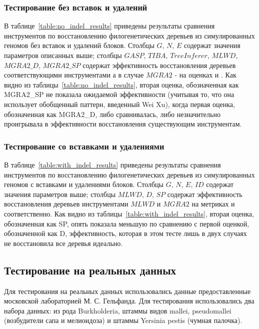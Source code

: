 \subsubsection{Тестирование без вставок и удалений}

В таблице~\ref{table:no_indel_results} приведены результаты сравнения инструментов
по восстановлению филогенетических деревьев из симулированных геномов без вставок и удалений блоков.
Столбцы $G$, $N$, $E$ содержат значения параметров описанных выше;
столбцы $GAS P$, $TIBA$, $TreeInferer$, $MLWD$, $MGRA2\_D$, $MGRA2\_SP$ содержат эффективность восстановления деревьев соответствующими инструментами
а в случае $MGRA2$ - на оценках  и .
Как видно из таблицы~\ref{table:no_indel_results}, вторая оценка, обозначенная как MGRA2\_SP не показала ожидаемой эффективности
(учитывая то, что она использует обобщенный паттерн, введенный Wei Xu),
когда первая оценка, обозначенная как MGRA2\_D, либо сравнивалась, либо незначительно проигрывала в эффективности восстановления существующим инструментам.

\subsubsection{Тестирование со вставками и удалениями}

В таблице~\ref{table:with_indel_results} приведены результаты сравнения инструментов
по восстановлению филогенетических деревьев из симулированных геномов с вставками и удалениями блоков.
Столбцы $G$, $N$, $E$, $ID$ содержат значения параметров выше;
столбцы $MLWD$, $D$, $SP$ содержат эффективность восстановления деревьев инструментами $MLWD$ и $MGRA2$ на метриках  и  соответственно.
Как видно из таблицы~\ref{table:with_indel_results}, вторая оценка, обозначенная как SP, опять показала меньшую
по сравнению с первой оценкой, обозначенной как D, эффективность, которая в этом тесте лишь в двух случаях не восстановила все деревья идеально.

\subsection{Тестирование на реальных данных}
Для тестирования на реальных данных использовались данные предоставленные московской лабораторией М. С. Гельфанда.
Для тестирования использовались два набора данных: из рода Burkholderia, штаммы видов mallei, pseudomallei (возбудители сапа и мелиоидоза)
и штаммы Yersinia pestis (чумная палочка).

